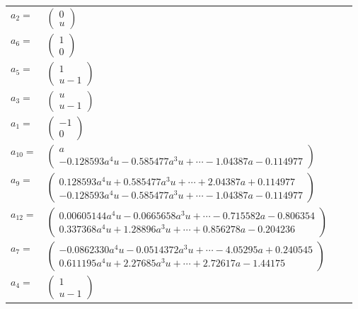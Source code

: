 \documentclass[1p]{elsarticle_modified}
\theoremstyle{definition}
\begin{document}
\begin{tabular}{m{7pt} m{180pt} m{7pt} m{180pt} }
\flushright $a_{2}=$&$\begin{pmatrix}0\\u\end{pmatrix}$ \\
\flushright $a_{6}=$&$\begin{pmatrix}1\\0\end{pmatrix}$ \\
\flushright $a_{5}=$&$\begin{pmatrix}1\\u-1\end{pmatrix}$ \\
\flushright $a_{3}=$&$\begin{pmatrix}u\\u-1\end{pmatrix}$ \\
\flushright $a_{1}=$&$\begin{pmatrix}-1\\0\end{pmatrix}$ \\
\flushright $a_{10}=$&$\begin{pmatrix}a\\-0.128593 a^{4} u-0.585477 a^{3} u+\cdots-1.04387 a-0.114977\end{pmatrix}$ \\
\flushright $a_{9}=$&$\begin{pmatrix}0.128593 a^{4} u+0.585477 a^{3} u+\cdots+2.04387 a+0.114977\\-0.128593 a^{4} u-0.585477 a^{3} u+\cdots-1.04387 a-0.114977\end{pmatrix}$ \\
\flushright $a_{12}=$&$\begin{pmatrix}0.00605144 a^{4} u-0.0665658 a^{3} u+\cdots-0.715582 a-0.806354\\0.337368 a^{4} u+1.28896 a^{3} u+\cdots+0.856278 a-0.204236\end{pmatrix}$ \\
\flushright $a_{7}=$&$\begin{pmatrix}-0.0862330 a^{4} u-0.0514372 a^{3} u+\cdots-4.05295 a+0.240545\\0.611195 a^{4} u+2.27685 a^{3} u+\cdots+2.72617 a-1.44175\end{pmatrix}$ \\
\flushright $a_{4}=$&$\begin{pmatrix}1\\u-1\end{pmatrix}$ \\

\end{tabular}
\end{document}
